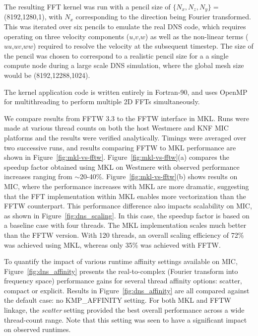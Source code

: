 The resulting FFT kernel was run with a pencil size of $\{N_x,N_z, N_y\} =$ 
(8192,1280,1), with $N_x$ corresponding to the direction being
Fourier transformed. This was iterated over six pencils to emulate
the real DNS code, which requires operating on three velocity components
($u$,$v$,$w$) as well as the non-linear terms ($uu$,$uv$,$ww$) required
to resolve the velocity at the subsequent timestep. The size of the
pencil was chosen to correspond to a realistic pencil size for a a
single compute node during a large scale DNS simulation, where the
global mesh size would be (8192,12288,1024). 

The kernel application code is written entirely in Fortran-90, and
uses OpenMP for multithreading to perform multiple 2D
FFTs simultaneously.

We compare results from FFTW 3.3 to the FFTW interface in MKL.  Runs
were made at various thread counts on both the host Westmere and KNF
MIC platforms and the results were verified analytically. Timings were
averaged over two successive runs, and results comparing FFTW to MKL
performance are shown in
Figure~\ref{fig:mkl-vs-fftw}. Figure~\ref{fig:mkl-vs-fftw}(a) compares
the speedup factor obtained using MKL on Westmere with observed
performance increases ranging from $\sim$20-40\%.
Figure~\ref{fig:mkl-vs-fftw}(b) shows results on MIC, where the
performance increases with MKL are more dramatic, suggesting that the
FFT implementation within MKL enables more vectorization than the FFTW
counterpart. This performance difference also impacts scalability on
MIC, as shown in Figure~\ref{fig:dns_scaling}.  In this case, the
speedup factor is based on a baseline case with four threads.  The MKL
implementation scales much better than the FFTW version. With 120
threads, an overall scaling efficiency of 72\% was achieved using MKL,
whereas only 35\% was achieved with FFTW.


To quantify the impact of various runtime affinity settings available
on MIC, Figure~\ref{fig:dns_affinity} presents the real-to-complex
(Fourier transform into frequency space) performance gains for several
thread affinity options: scatter, compact or
explicit. Results in Figure~\ref{fig:dns_affinity} are
all compared against the default case: no KMP\_AFFINITY setting.
For both MKL and FFTW
linkage, the {\em scatter} setting provided the best overall
performance across a wide thread-count range.  Note that this
setting was seen to have a significant impact on observed runtimes.

